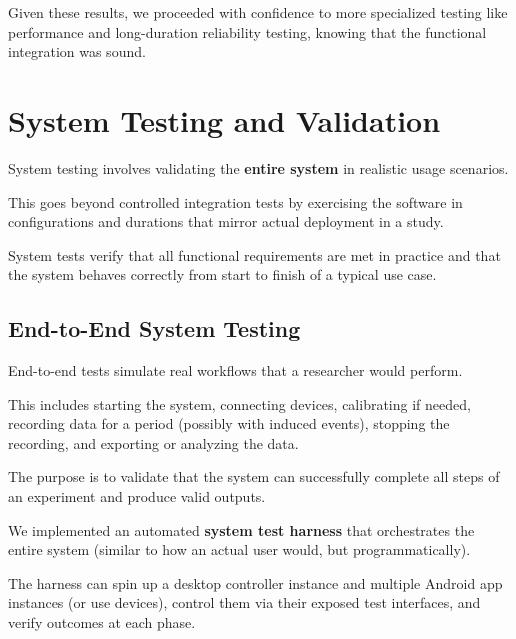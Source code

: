 {{Given these results, we proceeded with confidence to more specialized testing like
performance and long-duration reliability testing, knowing that the functional
integration was sound.

\section{System Testing and Validation}

System testing involves validating the \textbf{entire system}
 in realistic usage scenarios.

This goes beyond controlled integration tests by exercising the software in
configurations and durations that mirror actual deployment in a study.

System tests verify that all functional requirements are met in practice and that the
system behaves correctly from start to finish of a typical use case.

\subsection{End-to-End System Testing}

End-to-end tests simulate real workflows that a researcher would perform.

This includes starting the system, connecting devices, calibrating if needed,
recording data for a period (possibly with induced events), stopping the recording,
and exporting or analyzing the data.

The purpose is to validate that the system can successfully complete all steps of an
experiment and produce valid outputs.

We implemented an automated \textbf{system test harness}
 that orchestrates the entire system (similar to how an actual user would, but
 programmatically).

The harness can spin up a desktop controller instance and multiple Android app
instances (or use devices), control them via their exposed test interfaces, and
verify outcomes at each phase.

}}
